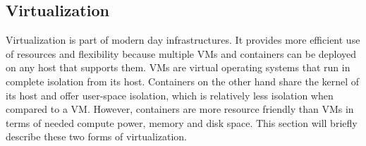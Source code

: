 \subsection{Virtualization}
\label{overview-virtualization}
Virtualization is part of modern day infrastructures. It provides more efficient use of resources and flexibility because multiple VMs and containers can be deployed on any host that supports them. VMs are virtual operating systems that run in complete isolation from its host. Containers on the other hand share the kernel of its host and offer user-space isolation, which is relatively less isolation when compared to a VM. However, containers are more resource friendly than VMs in terms of needed compute power, memory and disk space. This section will briefly describe these two forms of virtualization.

